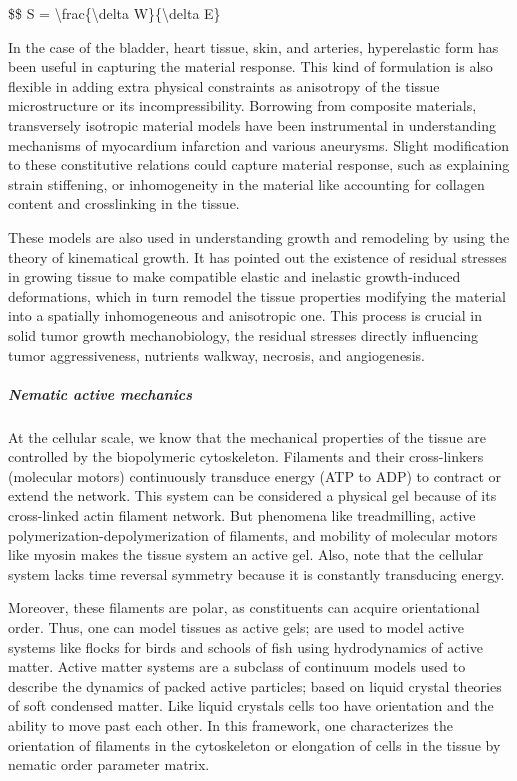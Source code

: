 \documentclass[
]{article}
\begin{document}
\$\$ S = \textbackslash frac\{\textbackslash delta
W\}\{\textbackslash delta E\}

In the case of the bladder, heart tissue, skin, and arteries,
hyperelastic form has been useful in capturing the material response.
This kind of formulation is also flexible in adding extra physical
constraints as anisotropy of the tissue microstructure or its
incompressibility. Borrowing from composite materials, transversely
isotropic material models have been instrumental in understanding
mechanisms of myocardium infarction and various aneurysms. Slight
modification to these constitutive relations could capture material
response, such as explaining strain stiffening, or inhomogeneity in the
material like accounting for collagen content and crosslinking in the
tissue.

These models are also used in understanding growth and remodeling by
using the theory of kinematical growth. It has pointed out the existence
of residual stresses in growing tissue to make compatible elastic and
inelastic growth-induced deformations, which in turn remodel the tissue
properties modifying the material into a spatially inhomogeneous and
anisotropic one. This process is crucial in solid tumor growth
mechanobiology, the residual stresses directly influencing tumor
aggressiveness, nutrients walkway, necrosis, and angiogenesis.

\hypertarget{nematic-active-mechanics}{%
\subparagraph{Nematic active mechanics}\label{nematic-active-mechanics}}

At the cellular scale, we know that the mechanical properties of the
tissue are controlled by the biopolymeric cytoskeleton. Filaments and
their cross-linkers (molecular motors) continuously transduce energy
(ATP to ADP) to contract or extend the network. This system can be
considered a physical gel because of its cross-linked actin filament
network. But phenomena like treadmilling, active
polymerization-depolymerization of filaments, and mobility of molecular
motors like myosin makes the tissue system an active gel. Also, note
that the cellular system lacks time reversal symmetry because it is
constantly transducing energy.

Moreover, these filaments are polar, as constituents can acquire
orientational order. Thus, one can model tissues as active gels; are
used to model active systems like flocks for birds and schools of fish
using hydrodynamics of active matter. Active matter systems are a
subclass of continuum models used to describe the dynamics of packed
active particles; based on liquid crystal theories of soft condensed
matter. Like liquid crystals cells too have orientation and the ability
to move past each other. In this framework, one characterizes the
orientation of filaments in the cytoskeleton or elongation of cells in
the tissue by nematic order parameter matrix.
\end{document}
